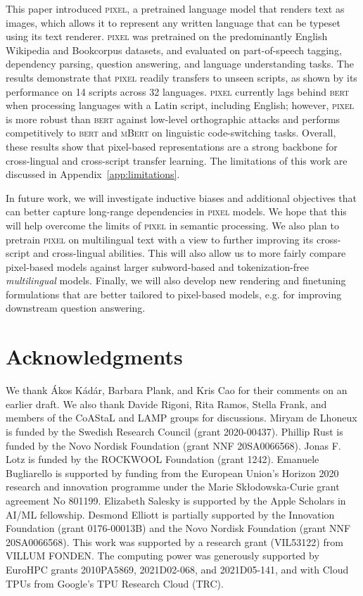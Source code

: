 \documentclass{article}
\newcommand{\model}{\textsc{pixel}\xspace}
\begin{document}
This paper introduced \model, a pretrained language model that renders text as images, which allows it to represent any written language that can be typeset using its text renderer. \model was pretrained on the predominantly English Wikipedia and Bookcorpus datasets, and evaluated on part-of-speech tagging, dependency parsing, question answering, and language understanding tasks. The results demonstrate that \model readily transfers to unseen scripts, as shown by its performance on 14 scripts across 32 languages. \model currently lags behind \textsc{bert} when processing languages with a Latin script, including English; however, \model is more robust than \textsc{bert} against low-level orthographic attacks and performs competitively to \textsc{bert} and \textsc{mBert} on linguistic code-switching tasks. Overall, these results show that pixel-based representations are a strong backbone for cross-lingual and cross-script transfer learning. The limitations of this work are discussed in Appendix~\ref{app:limitations}.

In future work, we will investigate inductive biases and additional objectives that can better capture long-range dependencies in \model models. We hope that this will help overcome the limits of \model in semantic processing.
We also plan to pretrain \model on multilingual text with a view to further improving its cross-script and cross-lingual abilities. This will also allow us to more fairly compare pixel-based models against larger subword-based and tokenization-free \textit{multilingual} models. Finally, we will also develop new rendering and finetuning formulations that are better tailored to pixel-based models, e.g. for improving downstream question answering.

\section*{Acknowledgments}
We thank Ákos Kádár, Barbara Plank, and Kris Cao for their comments on an earlier draft. We also thank Davide Rigoni, Rita Ramos, Stella Frank, and members of the CoAStaL and LAMP groups for discussions. Miryam de Lhoneux is funded by the Swedish Research Council (grant 2020-00437). Phillip Rust is funded by the Novo Nordisk Foundation (grant NNF 20SA0066568). Jonas F. Lotz is funded by the ROCKWOOL Foundation (grant 1242). {\scriptsize\euflag} Emanuele Bugliarello is supported by funding from the European Union's Horizon 2020 research and innovation programme under the Marie Sk\l{}odowska-Curie grant agreement No 801199. Elizabeth Salesky is supported by the Apple Scholars in AI/ML fellowship. Desmond Elliott is partially supported by the Innovation Foundation (grant 0176-00013B) and the Novo Nordisk Foundation (grant NNF 20SA0066568). This work was supported by a research grant (VIL53122) from VILLUM FONDEN. The computing power was generously supported by EuroHPC grants 2010PA5869, 2021D02-068, and 2021D05-141, and with Cloud TPUs from Google's TPU Research Cloud (TRC).
\end{document}
